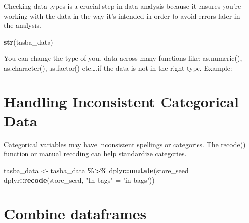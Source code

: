 \documentclass[
]{book}
\newenvironment{Shaded}{\begin{snugshade}}{\end{snugshade}}
\newcommand{\AttributeTok}[1]{\textcolor[rgb]{0.13,0.29,0.53}{#1}}
\newcommand{\FunctionTok}[1]{\textcolor[rgb]{0.13,0.29,0.53}{\textbf{#1}}}
\newcommand{\NormalTok}[1]{#1}
\newcommand{\OtherTok}[1]{\textcolor[rgb]{0.56,0.35,0.01}{#1}}
\newcommand{\SpecialCharTok}[1]{\textcolor[rgb]{0.81,0.36,0.00}{\textbf{#1}}}
\newcommand{\StringTok}[1]{\textcolor[rgb]{0.31,0.60,0.02}{#1}}
\begin{document}
Checking data types is a crucial step in data analysis because it ensures you're working with the data in the way it's intended in order to avoid errors later in the analysis.

\begin{Shaded}
\begin{Highlighting}[]
\FunctionTok{str}\NormalTok{(tasba\_data)}
\end{Highlighting}
\end{Shaded}

You can change the type of your data across many functions like: as.numeric(), as.character(), as.factor() etc\ldots.if the data is not in the right type.
Example:

\begin{Shaded}
\end{Shaded}

\hypertarget{handling-inconsistent-categorical-data}{%
\section{Handling Inconsistent Categorical Data}\label{handling-inconsistent-categorical-data}}

Categorical variables may have inconsistent spellings or categories. The recode() function or manual recoding can help standardize categories.

\begin{Shaded}
\begin{Highlighting}[]
\NormalTok{tasba\_data }\OtherTok{\textless{}{-}}\NormalTok{ tasba\_data }\SpecialCharTok{\%\textgreater{}\%}
\NormalTok{  dplyr}\SpecialCharTok{::}\FunctionTok{mutate}\NormalTok{(}\AttributeTok{store\_seed =}\NormalTok{ dplyr}\SpecialCharTok{::}\FunctionTok{recode}\NormalTok{(store\_seed, }\StringTok{"In bags"} \OtherTok{=} \StringTok{"in bags"}\NormalTok{))}
\end{Highlighting}
\end{Shaded}

\hypertarget{combine-dataframes}{%
\section{Combine dataframes}\label{combine-dataframes}}
\end{document}
